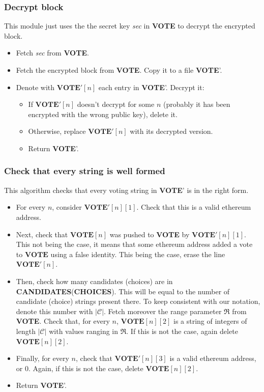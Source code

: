 \documentclass[submission, copyright,creativecommons,sharealike,noncommercial]{eptcs}
\newcommand{\candidates}{\ensuremath{\mathcal{C}} \xspace}
\newcommand{\range}{\ensuremath{\mathfrak{R}}\xspace}
\newcommand{\Candidates}{\textbf{CANDIDATES}\xspace}
\newcommand{\Choices}{\textbf{CHOICES}\xspace}
\newcommand{\Vote}{\textbf{VOTE}\xspace}
\begin{document}
\subsubsection{Decrypt block}\label{subsubsec:Decrypt block}
This module just uses the the secret key \emph{sec} in \Vote to decrypt the encrypted block.
	\begin{itemize}
		\item Fetch \emph{sec} from \Vote.
		\item Fetch the encrypted block from \Vote. Copy it to a file \Vote'.
		\item Denote with $\Vote'[n]$ each entry in \Vote'. Decrypt it:
		\begin{itemize}
			\item If $\Vote'[n]$ doesn't decrypt for some $n$ (probably it has been encrypted with the wrong public key), delete it.
			\item Otherwise, replace $\Vote'[n]$ with its decrypted version.
			\item Return \Vote'.
		\end{itemize}
	\end{itemize}


\subsubsection{Check that every string is well formed}\label{subsubsec:Check that every string is well formed}
	This algorithm checks that every voting string in \Vote' is in the right form.
	\begin{itemize}
		\item For every $n$, consider $\Vote'[n][1]$. Check that this is a valid ethereum address.
		
		\item Next, check that $\Vote[n]$ was pushed to \Vote by $\Vote'[n][1]$. This not being the case, it means that some ethereum address added a vote to $\Vote$ using a false identity. This being the case, erase the line $\Vote'[n]$. 
		
		\item Then, check how many candidates (choices) are in \Candidates (\Choices). This will be equal to the number of candidate (choice) strings present there. To keep consistent with our notation, denote this number with $|\candidates|$. Fetch moreover the range parameter $\range$ from \Vote. Check that, for every $n$, $\Vote[n][2]$ is a string of integers of length $|\candidates|$ with values ranging in $\range$. If this is not the case, again delete $\Vote[n][2]$.
		
		\item Finally, for every $n$, check that $\Vote'[n][3]$ is a valid ethereum address, or $0$. Again, if this is not the case, delete $\Vote[n][2]$.
		
		\item Return \Vote'.
	\end{itemize}
	
\end{document}
